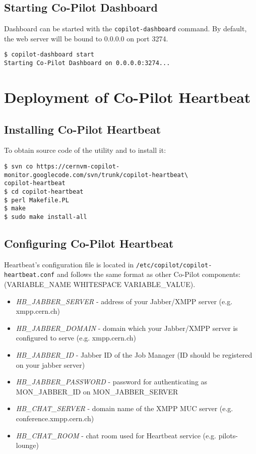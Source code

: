 \subsection{Starting Co-Pilot Dashboard}

Dashboard can be started with the \texttt{copilot-dashboard} command. By default, the web server will be bound to 0.0.0.0 on port 3274.
\lstset{caption=Starting Co-Pilot}
\begin{lstlisting}
$ copilot-dashboard start
Starting Co-Pilot Dashboard on 0.0.0.0:3274...
\end{lstlisting}

\section{Deployment of Co-Pilot Heartbeat}

\subsection{Installing Co-Pilot Heartbeat}

To obtain source code of the utility and to install it:
\lstset{caption=Installing the Monitor}
\begin{lstlisting}
$ svn co https://cernvm-copilot-monitor.googlecode.com/svn/trunk/copilot-heartbeat\
copilot-heartbeat
$ cd copilot-heartbeat
$ perl Makefile.PL
$ make
$ sudo make install-all
\end{lstlisting}

\subsection{Configuring Co-Pilot Heartbeat}

Heartbeat's configuration file is located in \texttt{/etc/copilot/copilot-heartbeat.conf} and follows the same format as other Co-Pilot components: (VARIABLE\_NAME WHITESPACE VARIABLE\_VALUE).

\begin{itemize}
  \item \emph{HB\_JABBER\_SERVER} - address of your Jabber/XMPP server (e.g. xmpp.cern.ch)
  \item \emph{HB\_JABBER\_DOMAIN} - domain which your Jabber/XMPP server is configured to serve (e.g. xmpp.cern.ch)
  \item \emph{HB\_JABBER\_ID} - Jabber ID of the Job Manager (ID should be registered on your jabber server)
  \item \emph{HB\_JABBER\_PASSWORD} - password for authenticating as MON\_JABBER\_ID on MON\_JABBER\_SERVER
  \item \emph{HB\_CHAT\_SERVER} - domain name of the XMPP MUC server (e.g. conference.xmpp.cern.ch)
  \item \emph{HB\_CHAT\_ROOM} - chat room used for Heartbeat service (e.g. pilots-lounge)
\end{itemize}

